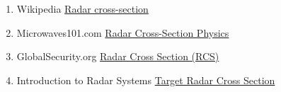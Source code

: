 \begin{enumerate}
	\begin{enumerate}
		\item Wikipedia \href{https://en.wikipedia.org/wiki/Radar_cross-section}{Radar cross-section}
		\item Microwaves101.com \href{https://www.microwaves101.com/encyclopedias/radar-cross-section-physics}{Radar Cross-Section Physics}
		\item GlobalSecurity.org \href{https://www.globalsecurity.org/military/world/stealth-aircraft-rcs.htm}{Radar Cross Section (RCS)}
		\item Introduction to Radar Systems  \href{https://www.ll.mit.edu/sites/default/files/outreach/doc/2018-07/lecture\%204.pdf}{Target Radar Cross Section}
	\end{enumerate}
\end{enumerate}


\endinput  %
